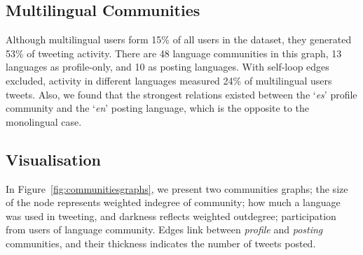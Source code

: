 \documentclass{llncs}
\begin{document}

\subsection{Multilingual Communities}

Although multilingual users form 15\% of all users in the dataset,
they generated 53\% of tweeting activity. There are 48 language
communities in this graph, 13 languages as profile-only, and 10 as
posting languages. With self-loop edges excluded, activity in
different languages measured 24\% of multilingual users tweets. Also,
we found that the strongest relations existed between the `\emph{es}'
profile community and the `\emph{en}' posting language, which is the
opposite to the monolingual case.


\subsection{Visualisation}

In Figure~\ref{fig:communitiesgraphs}, we present two communities
graphs; the size of the node represents weighted indegree of
community; how much a language was used in tweeting, and darkness
reflects weighted outdegree; participation from users of language
community. Edges link between \emph{profile} and \emph{posting}
communities, and their thickness indicates the number of tweets
posted.
\end{document}
